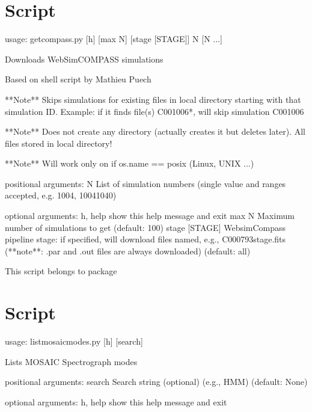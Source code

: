 \documentclass[letterpaper,10pt,english]{sphinxmanual}
\begin{document}
\section{Script }
\label{\detokenize{autoscripts/script-get-compass::doc}}\label{\detokenize{autoscripts/script-get-compass:script-get-compass-py}}
\begin{sphinxVerbatim}[commandchars=\\\{\}]
usage: get\PYGZhy{}compass.py [\PYGZhy{}h] [\PYGZhy{}\PYGZhy{}max N] [\PYGZhy{}\PYGZhy{}stage [STAGE]] N [N ...]

Downloads WebSim\PYGZhy{}COMPASS simulations

Based on shell script by Mathieu Puech

**Note** Skips simulations for existing files in local directory starting with
         that simulation ID.
         Example: if it finds file(s) \PYGZdq{}C001006*\PYGZdq{}, will skip simulation C001006

**Note** Does not create any directory (actually creates it but deletes later).
         All files stored in local directory!

**Note** Will work only on if os.name == \PYGZdq{}posix\PYGZdq{} (Linux, UNIX ...)

positional arguments:
  N                List of simulation numbers (single value and ranges
                   accepted, e.g. 1004, 1004\PYGZhy{}1040)

optional arguments:
  \PYGZhy{}h, \PYGZhy{}\PYGZhy{}help       show this help message and exit
  \PYGZhy{}\PYGZhy{}max N          Maximum number of simulations to get (default: 100)
  \PYGZhy{}\PYGZhy{}stage [STAGE]  Websim\PYGZhy{}Compass pipeline stage: if specified, will download
                   files named, e.g., C000793\PYGZus{}\PYGZlt{}stage\PYGZgt{}.fits (**note**: .par and
                   .out files are always downloaded) (default: all)
\end{sphinxVerbatim}

This script belongs to package 


\section{Script }
\label{\detokenize{autoscripts/script-list-mosaic-modes:script-list-mosaic-modes-py}}\label{\detokenize{autoscripts/script-list-mosaic-modes::doc}}
\begin{sphinxVerbatim}[commandchars=\\\{\}]
usage: list\PYGZhy{}mosaic\PYGZhy{}modes.py [\PYGZhy{}h] [search]

Lists MOSAIC Spectrograph modes

positional arguments:
  search      Search string (optional) (e.g., \PYGZdq{}HMM\PYGZdq{}) (default: None)

optional arguments:
  \PYGZhy{}h, \PYGZhy{}\PYGZhy{}help  show this help message and exit
\end{sphinxVerbatim}
\end{document}
